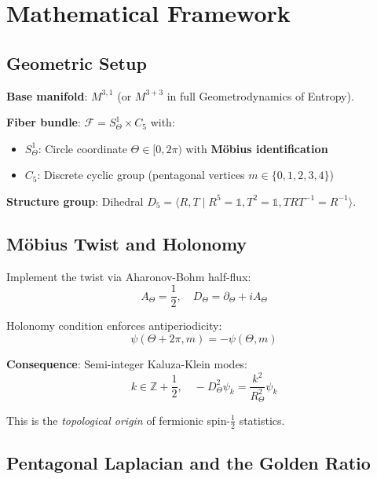 \documentclass[twocolumn,preprintnumbers,amsmath,amssymb,superscriptaddress]{revtex4-2}
\newcommand{\Dfive}{D_5}
\newcommand{\Cfive}{C_5}
\newcommand{\Rtheta}{R_\Theta}
\begin{document}
\section{Mathematical Framework}

\subsection{Geometric Setup}

\textbf{Base manifold}: $M^{3,1}$ (or $M^{3+3}$ in full Geometrodynamics of Entropy).

\textbf{Fiber bundle}: $\mathcal{F} = S^1_\Theta \times \Cfive$ with:
\begin{itemize}
\item $S^1_\Theta$: Circle coordinate $\Theta \in [0, 2\pi)$ with \textbf{M\"obius identification}
\item $\Cfive$: Discrete cyclic group (pentagonal vertices $m \in \{0,1,2,3,4\}$)
\end{itemize}

\textbf{Structure group}: Dihedral $\Dfive = \langle R, T \mid R^5 = \mathbb{1}, T^2 = \mathbb{1}, TRT^{-1} = R^{-1} \rangle$.

\subsection{M\"obius Twist and Holonomy}

Implement the twist via Aharonov-Bohm half-flux:
\begin{equation}
A_\Theta = \frac{1}{2}, \quad D_\Theta = \partial_\Theta + iA_\Theta
\end{equation}

Holonomy condition enforces antiperiodicity:
\begin{equation}
\boxed{\psi(\Theta + 2\pi, m) = -\psi(\Theta, m)}
\end{equation}

\textbf{Consequence}: Semi-integer Kaluza-Klein modes:
\begin{equation}
k \in \mathbb{Z} + \frac{1}{2}, \quad -D_\Theta^2 \psi_k = \frac{k^2}{\Rtheta^2} \psi_k
\end{equation}

This is the \textit{topological origin} of fermionic spin-$\frac{1}{2}$ statistics.

\subsection{Pentagonal Laplacian and the Golden Ratio}
\end{document}

